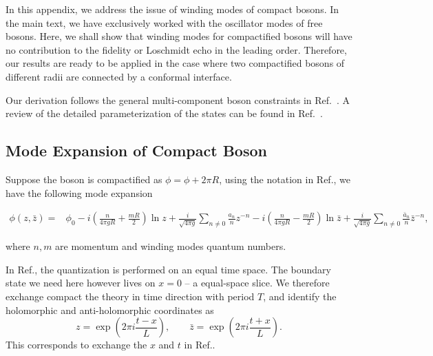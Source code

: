 
In this appendix, we address the issue of winding modes of compact bosons. In the main text, we have exclusively worked with the oscillator modes of free bosons. Here, we shall show that winding modes for compactified bosons will have no contribution to the fidelity or Loschmidt echo in the leading order. Therefore, our results are ready to be applied in the case where two compactified bosons of different radii are connected by a conformal interface\cite{PhysRevLett.118.136801}. 

Our derivation follows the general multi-component boson constraints in Ref.~. A review of the detailed parameterization of the states can be found in Ref.~. 

\subsection{Mode Expansion of Compact Boson}
Suppose the boson is compactified as $\phi =  \phi + 2\pi R$, using the notation in Ref., we have the following mode expansion 
\begin{widetext}
\begin{equation}
\label{eq:boson-mode-exp}
\begin{aligned}
\phi( z, \bar{z}) = &\phi_0 -i \left( \frac{n}{4\pi g  R} + \frac{m R }{2} \right)  \ln z + \frac{i}{\sqrt{4\pi g}} \sum_{n\ne 0 } \frac{a_n}{n} z^{-n } -i \left( \frac{n}{4\pi g R} - \frac{m R }{2} \right)  \ln \bar{z} + \frac{i}{\sqrt{4\pi g}} \sum_{n\ne 0 } \frac{\bar{a}_n}{n} \bar{z}^{-n } ,
\end{aligned}
\end{equation}\end{widetext}
where $n,m$ are momentum and winding modes quantum numbers. 

In Ref., the quantization is performed on an equal time space. The boundary state we need here however lives on $x = 0$ -- a equal-space slice. We therefore exchange compact the theory in time direction with period $T$, and identify the holomorphic and anti-holomorphic coordinates as 
\begin{equation}
\label{eq:zzbar}
z = \exp( 2 \pi i \frac{t - x}{L}), \qquad \bar{z} = \exp( 2 \pi i \frac{t + x}{L}).
\end{equation}
This corresponds to exchange the $x$ and $t$ in Ref.. 


